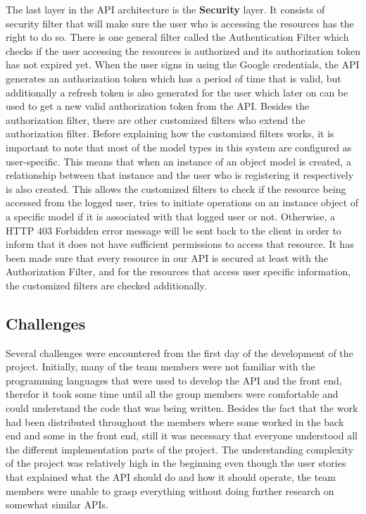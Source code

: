 The last layer in the API architecture is the \textbf{Security} layer. It consists of security filter that will make sure the user who is accessing the resources has the right to do so. There is one general filter called the Authentication Filter which checks if the user accessing the resources is authorized and its authorization token has not expired yet. When the user signs in using the Google credentials, the API generates an authorization token which has a period of time that is valid, but additionally a refresh token is also generated for the user which later on can be used to get a new valid authorization token from the API. Besides the authorization filter, there are other customized filters who extend the authorization filter. Before explaining how the customized filters works, it is important to note that most of the model types in this system are configured as user-specific. This means that when an instance of an object model is created, a relationship between that instance and the user who is registering it respectively is also created. This allows the customized filters to check if the resource being accessed from the logged user, tries to initiate operations on an instance object of a specific model if it is associated with that logged user or not. Otherwise, a HTTP 403 Forbidden error message will be sent back to the client in order to inform that it does not have sufficient permissions to access that resource. It has been made sure that every resource in our API is secured at least with the Authorization Filter, and for the resources that access user specific information, the customized filters are checked additionally. 

\subsection{Challenges}
Several challenges were encountered from the first day of the development of the project. Initially, many of the team members were not familiar with the programming languages that were used to develop the API and the front end, therefor it took some time until all the group members were comfortable and could understand the code that was being written. Besides the fact that the work had been distributed throughout the members where some worked in the back end and some in the front end, still it was necessary that everyone understood all the different implementation parts of the project. The understanding complexity of the project was relatively high in the beginning even though the user stories that explained what the API should do and how it should operate, the team members were unable to grasp everything without doing further research on somewhat similar APIs. 

